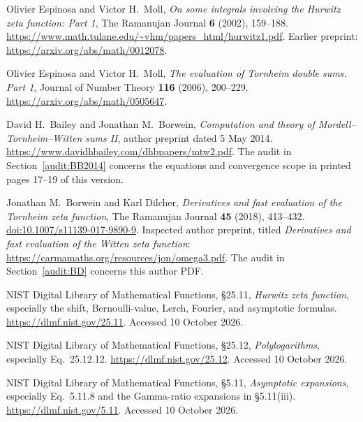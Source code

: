 Olivier Espinosa and Victor H.~Moll,
\emph{On some integrals involving the Hurwitz zeta function: Part 1},
The Ramanujan Journal \textbf{6} (2002), 159--188.
\url{https://www.math.tulane.edu/~vhm/papers_html/hurwitz1.pdf}.
Earlier preprint:
\url{https://arxiv.org/abs/math/0012078}.

Olivier Espinosa and Victor H.~Moll,
\emph{The evaluation of Tornheim double sums. Part 1},
Journal of Number Theory \textbf{116} (2006), 200--229.
\url{https://arxiv.org/abs/math/0505647}.

David H.~Bailey and Jonathan M.~Borwein,
\emph{Computation and theory of Mordell--Tornheim--Witten sums II},
author preprint dated 5 May 2014.
\url{https://www.davidhbailey.com/dhbpapers/mtw2.pdf}.
The audit in Section~\ref{audit:BB2014} concerns the equations and
convergence scope in printed pages 17--19 of this version.

Jonathan M.~Borwein and Karl Dilcher,
\emph{Derivatives and fast evaluation of the Tornheim zeta function},
The Ramanujan Journal \textbf{45} (2018), 413--432.
\href{https://doi.org/10.1007/s11139-017-9890-9}{doi:10.1007/s11139-017-9890-9}.
Inspected author preprint, titled \emph{Derivatives and fast evaluation
of the Witten zeta function}:
\url{https://carmamaths.org/resources/jon/omega3.pdf}.
The audit in Section~\ref{audit:BD} concerns this author PDF.

NIST Digital Library of Mathematical Functions,
\S25.11, \emph{Hurwitz zeta function}, especially the shift,
Bernoulli-value, Lerch, Fourier, and asymptotic formulas.
\url{https://dlmf.nist.gov/25.11}. Accessed 10 October 2026.

NIST Digital Library of Mathematical Functions,
\S25.12, \emph{Polylogarithms}, especially Eq.~25.12.12.
\url{https://dlmf.nist.gov/25.12}. Accessed 10 October 2026.

NIST Digital Library of Mathematical Functions,
\S5.11, \emph{Asymptotic expansions}, especially Eq.~5.11.8
and the Gamma-ratio expansions in \S5.11(iii).
\url{https://dlmf.nist.gov/5.11}. Accessed 10 October 2026.
